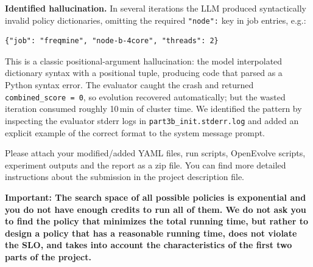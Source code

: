 \begin{enumerate}
\begin{enumerate}
\medskip
\noindent\textbf{Identified hallucination.}
In several iterations the LLM produced syntactically invalid policy dictionaries, omitting the required \texttt{"node":} key in job entries, e.g.:
\begin{verbatim}
{"job": "freqmine", "node-b-4core", "threads": 2}
\end{verbatim}
This is a classic positional-argument hallucination: the model interpolated dictionary syntax with a positional tuple, producing code that parsed as a Python syntax error. The evaluator caught the crash and returned \texttt{combined\_score = 0}, so evolution recovered automatically; but the wasted iteration consumed roughly 10\,min of cluster time. We identified the pattern by inspecting the evaluator stderr logs in \texttt{part3b\_init.stderr.log} and added an explicit example of the correct format to the system message prompt.


    \end{enumerate}

    Please attach your modified/added YAML files, run scripts, OpenEvolve scripts, experiment outputs and the report as a zip file. You can find more detailed instructions about the submission in the project description file.
    
    \textbf{Important: The search space of all possible policies is exponential and you do not have enough credits to run all of them. We do not ask you to find the policy that minimizes
    the total running time, but rather to design a policy that has a reasonable running time, does not violate the SLO, and takes into account the characteristics of the first two parts of the project.}
\end{enumerate}

\newpage
